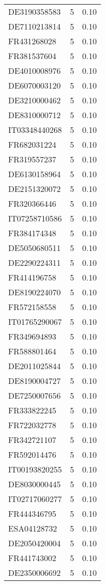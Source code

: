 \begin{table*}[htbp]
\begin{tabular}{lrr}
DE3190358583 & 5 & 0.10 \\
DE7110213814 & 5 & 0.10 \\
FR431268028 & 5 & 0.10 \\
FR381537604 & 5 & 0.10 \\
DE4010008976 & 5 & 0.10 \\
DE6070003120 & 5 & 0.10 \\
DE3210000462 & 5 & 0.10 \\
DE8310000712 & 5 & 0.10 \\
IT03348440268 & 5 & 0.10 \\
FR682031224 & 5 & 0.10 \\
FR319557237 & 5 & 0.10 \\
DE6130158964 & 5 & 0.10 \\
DE2151320072 & 5 & 0.10 \\
FR320366446 & 5 & 0.10 \\
IT07258710586 & 5 & 0.10 \\
FR384174348 & 5 & 0.10 \\
DE5050680511 & 5 & 0.10 \\
DE2290224311 & 5 & 0.10 \\
FR414196758 & 5 & 0.10 \\
DE8190224070 & 5 & 0.10 \\
FR572158558 & 5 & 0.10 \\
IT01765290067 & 5 & 0.10 \\
FR349694893 & 5 & 0.10 \\
FR588801464 & 5 & 0.10 \\
DE2011025844 & 5 & 0.10 \\
DE8190004727 & 5 & 0.10 \\
DE7250007656 & 5 & 0.10 \\
FR333822245 & 5 & 0.10 \\
FR722032778 & 5 & 0.10 \\
FR342721107 & 5 & 0.10 \\
FR592014476 & 5 & 0.10 \\
IT00193820255 & 5 & 0.10 \\
DE8030000445 & 5 & 0.10 \\
IT02717060277 & 5 & 0.10 \\
FR444346795 & 5 & 0.10 \\
ESA04128732 & 5 & 0.10 \\
DE2050420004 & 5 & 0.10 \\
FR441743002 & 5 & 0.10 \\
DE2350006692 & 5 & 0.10 \\

\end{tabular}
\end{table*}
